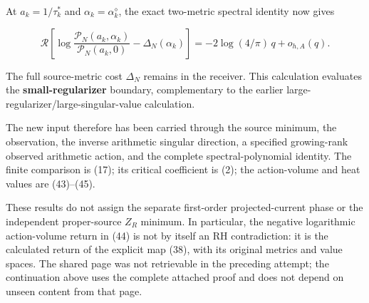 \documentclass[11pt]{article}
\begin{document}
At \(a_k=1/\tau_k^*\) and \(\alpha_k=\alpha_k^\diamond\), the exact two-metric spectral identity now gives

\[
\boxed{
\mathcal R\left[
\log\frac{\mathscr P_N(a_k,\alpha_k)}
{\mathscr P_N(a_k,0)}
-\Delta_N(\alpha_k)
\right]
=
-2\log(4/\pi)\,q+o_{h,A}(q).
}
\tag{48}
\]

The full source-metric cost \(\Delta_N\) remains in the receiver. This calculation evaluates the \textbf{small-regularizer} boundary, complementary to the earlier large-regularizer/large-singular-value calculation.

The new input therefore has been carried through the source minimum, the observation, the inverse arithmetic singular direction, a specified growing-rank observed arithmetic action, and the complete spectral-polynomial identity. The finite comparison is (17); its critical coefficient is (2); the action-volume and heat values are (43)--(45).

These results do not assign the separate first-order projected-current phase or the independent proper-source \(Z_R\) minimum. In particular, the negative logarithmic action-volume return in (44) is not by itself an RH contradiction: it is the calculated return of the explicit map (38), with its original metrics and value spaces. The shared page was not retrievable in the preceding attempt; the continuation above uses the complete attached proof and does not depend on unseen content from that page.
\end{document}
